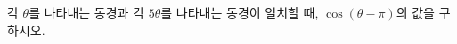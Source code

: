 각 $\theta$를 나타내는 동경과 각 $5\theta$를 나타내는 동경이 일치할 때, $\cos(\theta-\pi)$의 값을 구하시오. \cond{$\pi<\theta<2\pi$}
